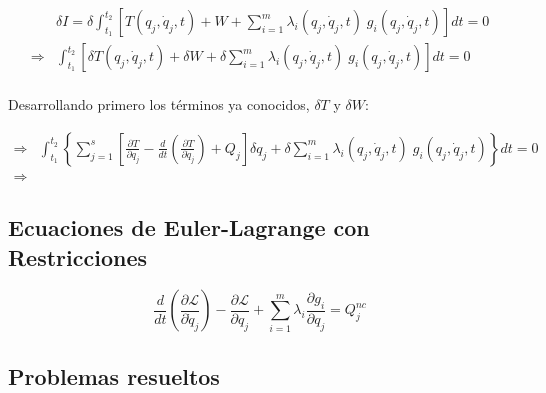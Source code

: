 \documentclass[/home/hernan-barquero/Documents/Apuntes_mecanica_teorica/main.tex]{subfiles}
\begin{document}
    \begin{align*}
        & \delta I = \delta  \int_{t_1}^{t_2} \left[ T\left(q_{j}, \dot{q}_{j}, t\right) + W + \sum_{i=1}^{m} \lambda_{i}\left(q_{j}, \dot{q}_{j}, t \right) \; g_{i}\left(q_{j}, \dot{q}_{j}, t \right) \right] dt = 0 \\ 
        \Rightarrow & \int_{t_1}^{t_2} \left[ \delta T\left(q_{j}, \dot{q}_{j}, t\right) + \delta  W + \delta \sum_{i=1}^{m} \lambda_{i}\left(q_{j}, \dot{q}_{j}, t \right) \; g_{i}\left(q_{j}, \dot{q}_{j}, t \right) \right] dt = 0 \\ 
    \end{align*}

    Desarrollando primero los términos ya conocidos, $\delta T$ y $\delta W$:

    \begin{align*}
        \Rightarrow &  \int_{t_1}^{t_2} \left\{ \sum_{j=1}^{s} \left[ \frac{\partial T}{\partial q_{j}}  - \frac{d}{d t} \left(\frac{\partial T}{\partial \dot{q}_{j}} \right) + Q_{j} \right] \delta q_{j}  + \delta \sum_{i=1}^{m} \lambda_{i}\left(q_{j}, \dot{q}_{j}, t \right) \; g_{i}\left(q_{j}, \dot{q}_{j}, t \right)\right\} dt = 0 \\ 
        \Rightarrow & 
    \end{align*}


    \subsection{Ecuaciones de Euler-Lagrange con Restricciones}
    \begin{definition}
        \begin{equation}
            \frac{d}{d t} \left(\frac{\partial \mathcal{L} }{\partial \dot{q}_{j}} \right) - \frac{\partial \mathcal{L}}{\partial q_{j}} + \sum_{i=1}^{m}\lambda_{i} \frac{\partial g_{i}}{\partial q_{j}}=  Q_{j}^{nc}
        \end{equation}
    \end{definition}


    \subsection{Problemas resueltos}
    
\end{document}
